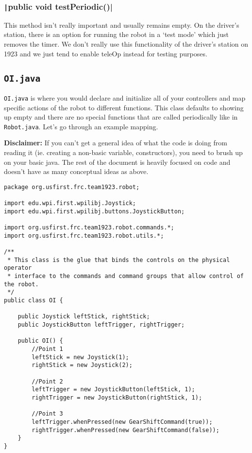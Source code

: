 \documentclass[11pt,fleqn]{article}
\newcommand{\mil}[2][java]{\texttt|#2|}
\begin{document}
\subsubsection{\mil{public void testPeriodic()}}
This method isn't really important and usually remains empty. On the driver's station, there is an option
for running the robot in a `test mode' which just removes the timer. We don't really use this functionality
of the driver's station on 1923 and we just tend to enable teleOp instead for testing purposes. 

\subsection{\texttt{OI.java}}

\texttt{OI.java} is where you would declare and initialize all of your controllers and map specific actions
of the robot to different functions. This class defaults to showing up empty and there are no special
functions that are called periodically like in \texttt{Robot.java}. Let's go through an example mapping.

\textbf{Disclaimer:} If you can't get a general idea of what the code is doing from reading it (ie.
creating a non-basic variable, constructors), you need to brush up on your basic java. The rest of
the document is heavily focused on code and doesn't have as many conceptual ideas as above. 

\begin{verbatim}
package org.usfirst.frc.team1923.robot;

import edu.wpi.first.wpilibj.Joystick;
import edu.wpi.first.wpilibj.buttons.JoystickButton;

import org.usfirst.frc.team1923.robot.commands.*;
import org.usfirst.frc.team1923.robot.utils.*;

/**
 * This class is the glue that binds the controls on the physical operator
 * interface to the commands and command groups that allow control of the robot.
 */
public class OI {

    public Joystick leftStick, rightStick;
    public JoystickButton leftTrigger, rightTrigger;

    public OI() {
        //Point 1
        leftStick = new Joystick(1);
        rightStick = new Joystick(2);

        //Point 2
        leftTrigger = new JoystickButton(leftStick, 1);
        rightTrigger = new JoystickButton(rightStick, 1);
        
        //Point 3
        leftTrigger.whenPressed(new GearShiftCommand(true));
        rightTrigger.whenPressed(new GearShiftCommand(false));
    }
}
\end{verbatim}
\end{document}
